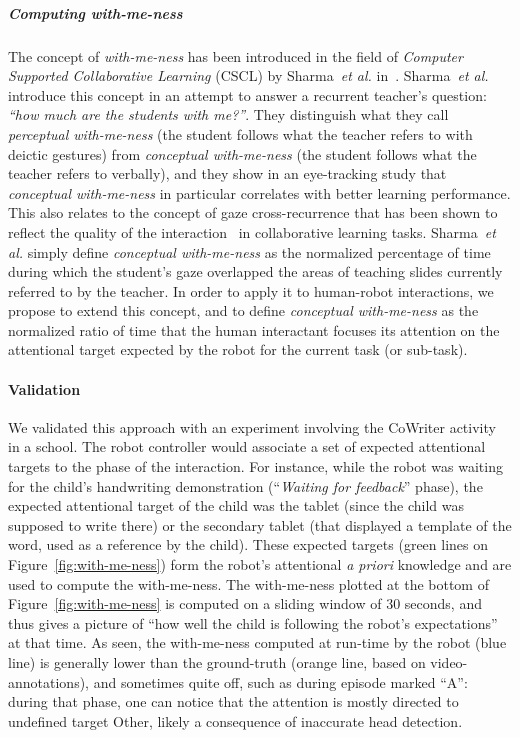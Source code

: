 \documentclass[10pt,a4paper]{article}
\newcommand{\etal}{\textit{et al.}\xspace}
\begin{document}
\subparagraph{Computing with-me-ness}
The concept of \emph{with-me-ness} has been introduced in the field of
\emph{Computer Supported Collaborative Learning} (CSCL) by Sharma~\etal
in~\cite{sharma2014me}. Sharma~\etal introduce this concept in an attempt to
answer a recurrent teacher's question: {\it ``how much are the students with
me?''}. They distinguish what they call \emph{perceptual with-me-ness} (the
student follows what the teacher refers to with deictic gestures) from
\emph{conceptual with-me-ness} (the student follows what the teacher refers to
verbally), and they show in an eye-tracking study that \emph{conceptual
with-me-ness} in particular correlates with better learning performance. This
also relates to the concept of gaze cross-recurrence that has been shown to
reflect the quality of the interaction~\cite{jermann2012effects} in
collaborative learning tasks. Sharma~\etal simply define \emph{conceptual with-me-ness} as the normalized
percentage of time during which the student's gaze overlapped the areas of
teaching slides currently referred to by the teacher.  In order to apply it to
human-robot interactions, we propose to extend this concept, and to define
\emph{conceptual with-me-ness} as the normalized ratio of time that the human
interactant focuses its attention on the attentional target expected by the
robot for the current task (or sub-task).
\paragraph{Validation}
We validated this approach with an experiment involving the CoWriter activity in a school.
The robot
controller would associate a set of expected attentional targets to the phase of
the interaction. For instance, while the robot was
waiting for the child's handwriting demonstration (``\textit{Waiting for
feedback}'' phase), the expected attentional target of the child was the tablet (since
the child was supposed to write there) or the secondary tablet (that displayed a
template of the word, used as a reference by the child). These expected targets
(green lines on Figure~\ref{fig:with-me-ness}) form the robot's attentional {\it
a priori} knowledge and are used to compute the with-me-ness. The with-me-ness plotted at the bottom of Figure~\ref{fig:with-me-ness} is computed on a sliding window of 30 seconds, and thus gives a picture of
``how well the child is following the robot's expectations'' at that time. As
seen, the with-me-ness computed at run-time by the robot (blue line) is
generally lower than the ground-truth (orange line, based on video-annotations),
and sometimes quite off, such as during episode marked ``A'': during that phase,
one can notice that the attention is mostly directed to undefined target {\sf
Other}, likely a consequence of inaccurate head detection.  
\end{document}
